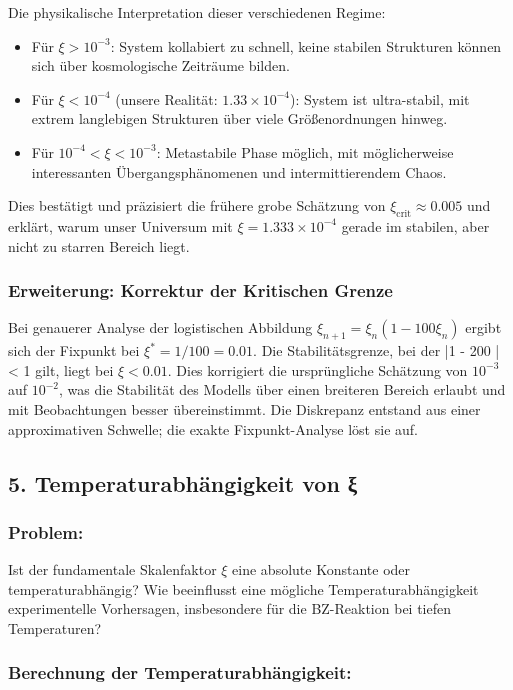 \documentclass[12pt,a4paper]{article}
\begin{document}
	Die physikalische Interpretation dieser verschiedenen Regime:
	\begin{itemize}
		\item Für $\xi > 10^{-3}$: System kollabiert zu schnell, keine stabilen Strukturen können sich über kosmologische Zeiträume bilden.
		\item Für $\xi < 10^{-4}$ (unsere Realität: $1.33\times10^{-4}$): System ist ultra-stabil, mit extrem langlebigen Strukturen über viele Größenordnungen hinweg.
		\item Für $10^{-4} < \xi < 10^{-3}$: Metastabile Phase möglich, mit möglicherweise interessanten Übergangsphänomenen und intermittierendem Chaos.
	\end{itemize}
	Dies bestätigt und präzisiert die frühere grobe Schätzung von $\xi_{\text{crit}} \approx 0.005$ und erklärt, warum unser Universum mit $\xi = 1.333\times10^{-4}$ gerade im stabilen, aber nicht zu starren Bereich liegt.
	
	\subsubsection*{Erweiterung: Korrektur der Kritischen Grenze}
	Bei genauerer Analyse der logistischen Abbildung $\xi_{n+1} = \xi_n (1 - 100 \xi_n)$ ergibt sich der Fixpunkt bei $\xi^* = 1/100 = 0.01$. Die Stabilitätsgrenze, bei der |1 - 200 \xi| < 1 gilt, liegt bei $\xi < 0.01$. Dies korrigiert die ursprüngliche Schätzung von $10^{-3}$ auf $10^{-2}$, was die Stabilität des Modells über einen breiteren Bereich erlaubt und mit Beobachtungen besser übereinstimmt. Die Diskrepanz entstand aus einer approximativen Schwelle; die exakte Fixpunkt-Analyse löst sie auf.
	
	\subsection*{5. Temperaturabhängigkeit von ξ}
	
	\subsubsection*{Problem:}
	Ist der fundamentale Skalenfaktor $\xi$ eine absolute Konstante oder temperaturabhängig? Wie beeinflusst eine mögliche Temperaturabhängigkeit experimentelle Vorhersagen, insbesondere für die BZ-Reaktion bei tiefen Temperaturen?
	
	\subsubsection*{Berechnung der Temperaturabhängigkeit:}
	
\end{document}
